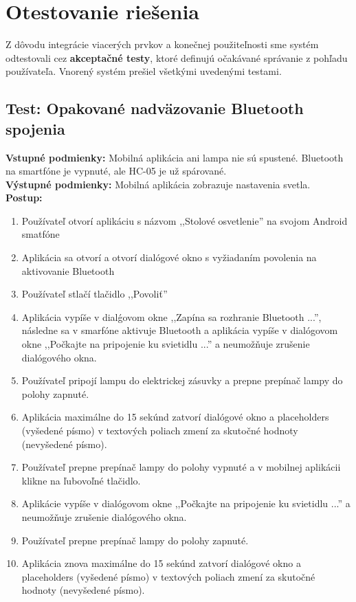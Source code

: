 \documentclass[12pt, a4paper]{article}
\begin{document}
\section{Otestovanie riešenia}
Z dôvodu integrácie viacerých prvkov a konečnej použiteľnosti sme systém odtestovali cez \textbf{akceptačné testy}, ktoré definujú očakávané správanie z pohľadu používateľa. Vnorený systém prešiel všetkými uvedenými testami.
\vspace{1em}

\subsection{Test: Opakované nadväzovanie Bluetooth spojenia}
\noindent\textbf{Vstupné podmienky:} Mobilná aplikácia ani lampa nie sú spustené. Bluetooth na smartfóne je vypnuté, ale HC-05 je už spárované. \\
\textbf{Výstupné podmienky:} Mobilná aplikácia zobrazuje nastavenia svetla. \\
\textbf{Postup:}
\begin{enumerate}
\itemsep0pt
\item Používateľ otvorí aplikáciu s názvom ,,Stolové osvetlenie'' na svojom Android smatfóne 
\item Aplikácia sa otvorí a otvorí dialógové okno s vyžiadaním povolenia na aktivovanie Bluetooth
\item Používateľ stlačí tlačidlo ,,Povoliť''
\item Aplikácia vypíše v dialǵovom okne ,,Zapína sa rozhranie Bluetooth ...'', následne sa v smarfóne aktivuje Bluetooth
a aplikácia vypíše v dialógovom okne ,,Počkajte na pripojenie ku svietidlu ...'' a neumožňuje zrušenie dialógového okna.
\item Používateľ pripojí lampu do elektrickej zásuvky a prepne prepínač lampy do polohy zapnuté.
\item Aplikácia maximálne do 15 sekúnd zatvorí dialógové okno a placeholders (vyšedené písmo) v textových poliach zmení za skutočné hodnoty (nevyšedené písmo).
\item Používateľ prepne prepínač lampy do polohy vypnuté a v mobilnej aplikácii klikne na ľubovoľné tlačidlo.
\item Aplikácie vypíše v dialógovom okne ,,Počkajte na pripojenie ku svietidlu ...'' a neumožňuje zrušenie dialógového okna.
\item Používateľ prepne prepínač lampy do polohy zapnuté.
\item Aplikácia znova maximálne do 15 sekúnd zatvorí dialógové okno a placeholders (vyšedené písmo) v textových poliach zmení za skutočné hodnoty (nevyšedené písmo).
\end{enumerate}
\end{document}
